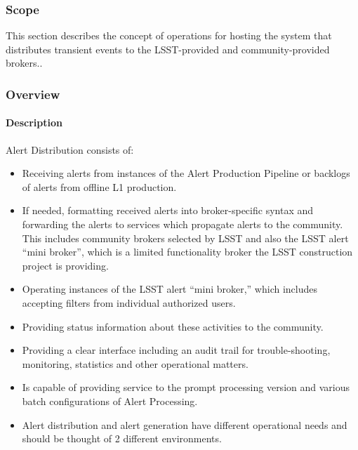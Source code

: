 \subsubsection{Scope}
This section describes the concept of operations for hosting the system that distributes transient events to the LSST-provided and community-provided brokers..

\subsubsection{Overview}

\paragraph{Description}

Alert Distribution consists of:
\begin{itemize}

\item Receiving alerts from instances of the Alert Production Pipeline or backlogs of alerts from offline L1 production.

\item If needed, formatting received alerts into broker-specific syntax and forwarding the alerts to services which propagate alerts to the community. This includes  community brokers selected by LSST and also  the LSST alert “mini broker”, which is a limited functionality broker the LSST construction project is providing.

\item Operating instances of the LSST alert “mini broker,” which includes accepting filters from individual authorized users.

\item Providing status information about these activities to the community.

\item Providing a clear interface including an audit trail for trouble-shooting, monitoring, statistics and other operational matters.

\item Is capable of providing service to the prompt processing version and various batch configurations of Alert Processing.
\item Alert distribution and alert generation have different operational needs and should be thought of 2 different environments.

\end{itemize}


